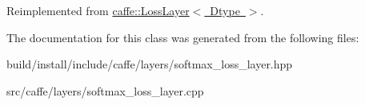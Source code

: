 Reimplemented from \mbox{\hyperlink{classcaffe_1_1_loss_layer_abf00412194f5413ea9468ee44b0d986f}{caffe\+::\+Loss\+Layer$<$ Dtype $>$}}.



The documentation for this class was generated from the following files\+:\begin{DoxyCompactItemize}
\item 
build/install/include/caffe/layers/softmax\+\_\+loss\+\_\+layer.\+hpp\item 
src/caffe/layers/softmax\+\_\+loss\+\_\+layer.\+cpp\end{DoxyCompactItemize}
